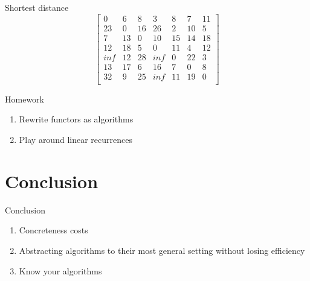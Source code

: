 \documentclass[10pt]{beamer}
\begin{document}
\begin{frame}[fragile]{Shortest distance}
\[
\begin{bmatrix}
0	&	6	&	8	&	3	&	8	&	7	&	11		\\
23 &	0	&	16 & 26	&	2	&	10	&	5	 \\
7	&	13 &	0	&	10 & 15	&	14	&	18 \\
12 & 18	&	5	&	0	&	11	&	4	&	12 \\
inf	&	12 & 28	&	inf	&	0	&	22 &	3	\\
13 &	17 &	6	&	16 &	7	&	0	&	8	\\
32 &	9	&	25	&	inf	&	11 &	19 &	0	\\
\end{bmatrix}
\]
\end{frame}

\begin{frame}{Homework}
  \begin{enumerate}
    \item Rewrite functors as algorithms 
    \item Play around linear recurrences
  \end{enumerate}
\end{frame}


\section{Conclusion}

\begin{frame}{Conclusion}
  \begin{enumerate}
    \item Concreteness costs
    \item Abstracting algorithms to their most general setting without losing efficiency
    \item Know your algorithms
  \end{enumerate}
\end{frame}
\end{document}
